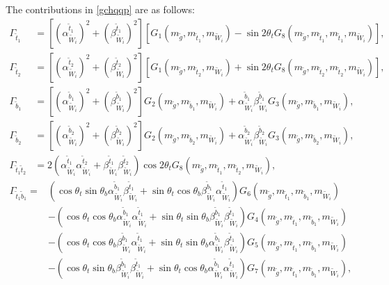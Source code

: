 \documentclass[final,3p,times]{elsarticle}
\begin{document}
The contributions in \eqref{gchqqp} are as follows:
\begin{align}
\Gamma_{\tilde{t}_1} &= [(\alpha_{\tilde{W}_i}^{\tilde{t}_1})^2 + (\beta_{\tilde{W}_i}^{\tilde{t}_1})^2]\left[G_{1}(m_{\tilde{g}},m_{\tilde{t}_1},m_{\tilde{W}_i}) - \sin 2\theta_t G_{8} (m_{\tilde{g}},m_{\tilde{t}_1},m_{\tilde{t}_1}, m_{\tilde{W}_i})\right], \\
\Gamma_{\tilde{t}_2} &= [(\alpha_{\tilde{W}_i}^{\tilde{t}_2})^2 + (\beta_{\tilde{W}_i}^{\tilde{t}_2})^2]\left[G_{1}(m_{\tilde{g}},m_{\tilde{t}_2},m_{\tilde{W}_i}) + \sin 2\theta_t G_{8} (m_{\tilde{g}},m_{\tilde{t}_2},m_{\tilde{t}_2}, m_{\tilde{W}_i})\right], \\
\Gamma_{\tilde{b}_1} &= [(\alpha_{\tilde{W}_i}^{\tilde{b}_1})^2 + (\beta_{\tilde{W}_i}^{\tilde{b}_1})^2]G_{2}(m_{\tilde{g}},m_{\tilde{b}_1},m_{\tilde{W}_i}) + \alpha_{\tilde{W}_i}^{\tilde{b}_1} \beta_{\tilde{W}_i}^{\tilde{b}_1} G_{3} (m_{\tilde{g}},m_{\tilde{b}_1}, m_{\tilde{W}_i}), \\
\Gamma_{\tilde{b}_2} &= [(\alpha_{\tilde{W}_i}^{\tilde{b}_2})^2 + (\beta_{\tilde{W}_i}^{\tilde{b}_2})^2]G_{2}(m_{\tilde{g}},m_{\tilde{b}_2},m_{\tilde{W}_i}) + \alpha_{\tilde{W}_i}^{\tilde{b}_2} \beta_{\tilde{W}_i}^{\tilde{b}_2} G_{3} (m_{\tilde{g}},m_{\tilde{b}_2}, m_{\tilde{W}_i}), \\
\Gamma_{\tilde{t}_1 \tilde{t}_2} &= 2(\alpha_{\tilde{W}_i}^{\tilde{t}_1} \alpha_{\tilde{W}_i}^{\tilde{t}_2} + \beta_{\tilde{W}_i}^{\tilde{t}_1} \beta_{\tilde{W}_i}^{\tilde{t}_2})\cos 2\theta_t G_{8}(m_{\tilde{g}},m_{\tilde{t}_1},m_{\tilde{t}_2},m_{\tilde{W}_i}),
\end{align}
\begin{equation}
\begin{aligned}
\Gamma_{\tilde{t}_1 \tilde{b}_1} = & (\cos\theta_t \sin\theta_b \alpha_{\tilde{W}_i}^{\tilde{b}_1} \beta_{\tilde{W}_i}^{\tilde{t}_1} + \sin\theta_t \cos\theta_b \beta_{\tilde{W}_i}^{\tilde{b}_1} \alpha_{\tilde{W}_i}^{\tilde{t}_1})G_{6}(m_{\tilde{g}},m_{\tilde{t}_1},m_{\tilde{b}_1},m_{\tilde{W}_i}) \\ & - (\cos\theta_t \cos\theta_b \alpha_{\tilde{W}_i}^{\tilde{b}_1}\alpha_{\tilde{W}_i}^{\tilde{t}_1} + \sin\theta_t \sin\theta_b \beta_{\tilde{W}_i}^{\tilde{b}_1}\beta_{\tilde{W}_i}^{\tilde{t}_1}) G_{4}(m_{\tilde{g}},m_{\tilde{t}_1}, m_{\tilde{b}_1},m_{\tilde{W}_i}) \\ & - (\cos\theta_t \cos\theta_b \beta_{\tilde{W}_i}^{\tilde{b}_1} \alpha_{\tilde{W}_i}^{\tilde{t}_1} + \sin\theta_t \sin\theta_b \alpha_{\tilde{W}_i}^{\tilde{b}_1} \beta_{\tilde{W}_i}^{\tilde{t}_1})G_{5}(m_{\tilde{g}},m_{\tilde{t}_1}, m_{\tilde{b}_1}, m_{\tilde{W}_i}) \\ & - (\cos\theta_t\sin\theta_b \beta_{\tilde{W}_i}^{\tilde{b}_1} \beta_{\tilde{W}_i}^{\tilde{t}_1} + \sin\theta_t \cos\theta_b \alpha_{\tilde{W}_i}^{\tilde{b}_1} \alpha_{\tilde{W}_i}^{\tilde{t}_1})G_{7}(m_{\tilde{g}},m_{\tilde{t}_1},m_{\tilde{b}_1},m_{\tilde{W}_i}),
\end{aligned}
\end{equation}
\end{document}
